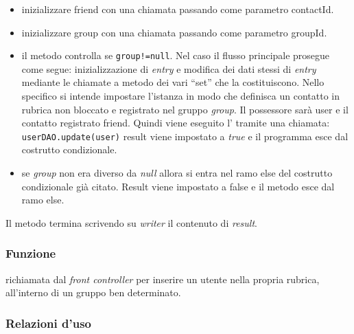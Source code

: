 \begin{description}
\begin{itemize}
		\item inizializzare friend con una chiamata  passando come parametro contactId.
		\item inizializzare group con una chiamata  passando come parametro groupId.
		\item il metodo controlla se \texttt{group!=null}. Nel caso il flusso principale prosegue come segue: inizializzazione di \textit{entry} e modifica dei dati stessi di \textit{entry} mediante le chiamate a metodo dei vari ``set'' che la costituiscono. Nello specifico si intende impostare l'istanza in modo che definisca un contatto in rubrica non bloccato e registrato nel gruppo \textit{group}. Il possessore sarà user e il contatto registrato friend. Quindi viene eseguito l' tramite una chiamata:\\
		\verb|userDAO.update(user)|
		result viene impostato a \textit{true} e il programma esce dal costrutto condizionale.
		\item se \textit{group} non era diverso da \textit{null} allora si entra nel ramo else del costrutto condizionale già citato. Result viene impostato a false e il metodo esce dal ramo else.
	\end{itemize}
	Il metodo termina scrivendo su \textit{writer} il contenuto di \textit{result}.
	
\end{description}



\subsubsection*{Funzione}
 richiamata dal \textit{front controller} per inserire un utente nella propria rubrica, all'interno di un gruppo ben determinato.

\subsubsection*{Relazioni d'uso}

